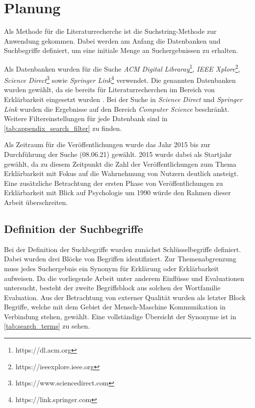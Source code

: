 \section{Planung}

Als Methode für die Literaturrecherche ist die Suchstring-Methode zur Anwendung gekommen. Dabei werden am Anfang die Datenbanken und Suchbegriffe definiert, um eine initiale Menge an Suchergebnissen zu erhalten.

Als Datenbanken wurden für die Suche \textit{ACM Digital Libraray}\footnote{https://dl.acm.org}, \textit{IEEE Xplore}\footnote{https://ieeexplore.ieee.org}, \textit{Science Direct}\footnote{https://www.sciencedirect.com} sowie \textit{Springer Link}\footnote{https://link.springer.com} verwendet. Die genannten Datenbanken wurden gewählt, da sie bereits für Literaturrecherchen im Bereich von Erklärbarkeit eingesetzt wurden \cite{nunes_systematic_2017, carvalho2017quality}. Bei der Suche in \textit{Science Direct} und \textit{Springer Link} wurden die Ergebnisse auf den Bereich \textit{Computer Science} beschränkt. Weitere Filtereinstellungen für jede Datenbank sind in \autoref{tab:appendix_search_filter} zu finden.

Als Zeitraum für die Veröffentlichungen wurde das Jahr 2015 bis zur Durchführung der Suche (08.06.21) gewählt. 2015 wurde dabei als Startjahr gewählt, da zu diesem Zeitpunkt die Zahl der Veröffentlichungen zum Thema Erklärbarkeit mit Fokus auf die Wahrnehmung von Nutzern deutlich ansteigt. Eine zusätzliche Betrachtung der ersten Phase von Veröffentlichungen zu Erklärbarkeit mit Blick auf Psychologie um 1990 würde den Rahmen dieser Arbeit überschreiten.

\subsection{Definition der Suchbegriffe}

Bei der Definition der Suchbegriffe wurden zunächst Schlüsselbegriffe definiert. Dabei wurden drei Blöcke von Begriffen identifiziert. Zur Themenabgrenzung muss jedes Suchergebnis ein Synonym für \glqq Erklärung\grqq{} oder \glqq Erklärbarkeit\grqq{} aufweisen. Da die vorliegende Arbeit unter anderem Einflüsse und Evaluationen untersucht, besteht der zweite Begriffsblock aus solchen der Wortfamilie \glqq Evaluation\grqq{}. Aus der Betrachtung von externer Qualität wurden als letzter Block Begriffe, welche mit dem Gebiet der Mensch-Maschine Kommunikation in Verbindung stehen, gewählt. Eine vollständige Übersicht der Synonyme ist in \autoref{tab:search_terms} zu sehen.

